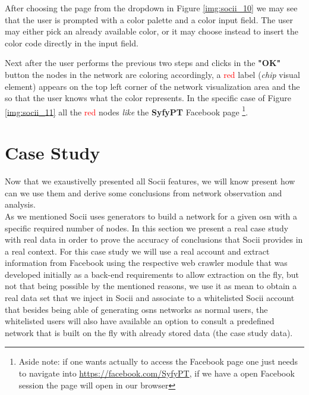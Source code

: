 \indent After choosing the page from the dropdown in Figure \ref{img:socii_10} we may see that the user is prompted with a color palette and a color input field. The user may either pick an already available color, or it may choose instead to insert the color code directly in the input field.

\indent Next after the user performs the previous two steps and clicks in the \textbf{"OK"} button the nodes in the network are coloring accordingly, a \textcolor{red}{red} label (\textit{chip} visual element) appears on the top left corner of the network visualization area and the so that the user knows what the color represents. In the specific case of Figure \ref{img:socii_11} all the \textcolor{red}{red} nodes \textit{like} the \textbf{SyfyPT} Facebook page \footnote{Aside note: if one wants actually to access the Facebook page one just needs to navigate into \url{https://facebook.com/SyfyPT}, if we have a open Facebook session the page will open in our browser}.


\clearpage

\section{Case Study}
Now that we exaustivelly presented all Socii features, we will know present how can we use them and derive some conclusions from network observation and analysis.\\
\indent As we mentioned Socii uses generators to build a network for a given \gls{osn} with a specific required number of nodes. In this section we present a real case study with real data in order to prove the accuracy of conclusions that Socii provides in a real context. For this case study we will use a real account and extract information from Facebook using the respective web crawler module that was developed initially as a back-end requirements to allow extraction on the fly, but not that being possible by the mentioned reasons, we use it as mean to obtain a real data set that we inject in Socii and associate to a whitelisted Socii account that besides being able of generating \glspl{osn} networks as normal users, the whitelisted users will also have available an option to consult a predefined network that is built on the fly with already stored data (the case study data).

